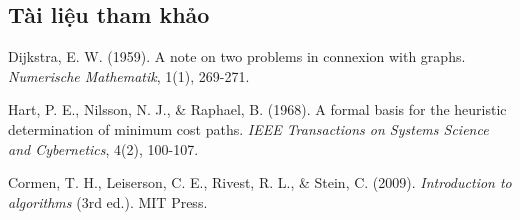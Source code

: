 \documentclass[a4paper,12pt]{article}
\begin{document}
\newpage
\begin{center}
\section*{Tài liệu tham khảo}
\end{center}
\vspace{-2em}
\renewcommand{\refname}{}
\begin{thebibliography}{99}

Dijkstra, E. W. (1959). A note on two problems in connexion with graphs. \textit{Numerische Mathematik}, 1(1), 269-271.

Hart, P. E., Nilsson, N. J., \& Raphael, B. (1968). A formal basis for the heuristic determination of minimum cost paths. \textit{IEEE Transactions on Systems Science and Cybernetics}, 4(2), 100-107.

Cormen, T. H., Leiserson, C. E., Rivest, R. L., \& Stein, C. (2009). \textit{Introduction to algorithms} (3rd ed.). MIT Press.

\end{thebibliography}
\end{document}
